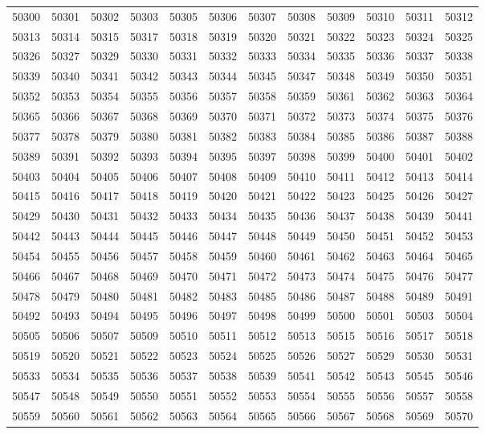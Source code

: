 \begin{center}
\begin{longtable}{llllllllllll}
50300 &50301 &50302 &50303 &50305 &50306 &50307 &50308 &50309 &50310 &50311 &50312 \\
50313 &50314 &50315 &50317 &50318 &50319 &50320 &50321 &50322 &50323 &50324 &50325 \\
50326 &50327 &50329 &50330 &50331 &50332 &50333 &50334 &50335 &50336 &50337 &50338 \\
50339 &50340 &50341 &50342 &50343 &50344 &50345 &50347 &50348 &50349 &50350 &50351 \\
50352 &50353 &50354 &50355 &50356 &50357 &50358 &50359 &50361 &50362 &50363 &50364 \\
50365 &50366 &50367 &50368 &50369 &50370 &50371 &50372 &50373 &50374 &50375 &50376 \\
50377 &50378 &50379 &50380 &50381 &50382 &50383 &50384 &50385 &50386 &50387 &50388 \\
50389 &50391 &50392 &50393 &50394 &50395 &50397 &50398 &50399 &50400 &50401 &50402 \\
50403 &50404 &50405 &50406 &50407 &50408 &50409 &50410 &50411 &50412 &50413 &50414 \\
50415 &50416 &50417 &50418 &50419 &50420 &50421 &50422 &50423 &50425 &50426 &50427 \\
50429 &50430 &50431 &50432 &50433 &50434 &50435 &50436 &50437 &50438 &50439 &50441 \\
50442 &50443 &50444 &50445 &50446 &50447 &50448 &50449 &50450 &50451 &50452 &50453 \\
50454 &50455 &50456 &50457 &50458 &50459 &50460 &50461 &50462 &50463 &50464 &50465 \\
50466 &50467 &50468 &50469 &50470 &50471 &50472 &50473 &50474 &50475 &50476 &50477 \\
50478 &50479 &50480 &50481 &50482 &50483 &50485 &50486 &50487 &50488 &50489 &50491 \\
50492 &50493 &50494 &50495 &50496 &50497 &50498 &50499 &50500 &50501 &50503 &50504 \\
50505 &50506 &50507 &50509 &50510 &50511 &50512 &50513 &50515 &50516 &50517 &50518 \\
50519 &50520 &50521 &50522 &50523 &50524 &50525 &50526 &50527 &50529 &50530 &50531 \\
50533 &50534 &50535 &50536 &50537 &50538 &50539 &50541 &50542 &50543 &50545 &50546 \\
50547 &50548 &50549 &50550 &50551 &50552 &50553 &50554 &50555 &50556 &50557 &50558 \\
50559 &50560 &50561 &50562 &50563 &50564 &50565 &50566 &50567 &50568 &50569 &50570 \\

\end{longtable}
\end{center}
